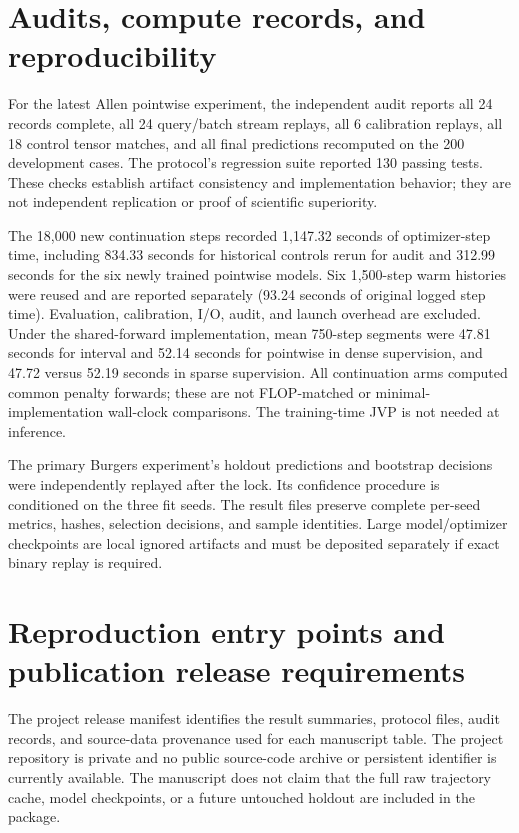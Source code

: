 \documentclass[10pt,a4paper]{article}
\begin{document}
\section{Audits, compute records, and reproducibility}
For the latest Allen pointwise experiment, the independent audit reports all 24 records complete, all 24 query/batch stream replays, all 6 calibration replays, all 18 control tensor matches, and all final predictions recomputed on the 200 development cases. The protocol's regression suite reported 130 passing tests. These checks establish artifact consistency and implementation behavior; they are not independent replication or proof of scientific superiority.

The 18,000 new continuation steps recorded 1,147.32 seconds of optimizer-step time, including 834.33 seconds for historical controls rerun for audit and 312.99 seconds for the six newly trained pointwise models. Six 1,500-step warm histories were reused and are reported separately (93.24 seconds of original logged step time). Evaluation, calibration, I/O, audit, and launch overhead are excluded. Under the shared-forward implementation, mean 750-step segments were 47.81 seconds for interval and 52.14 seconds for pointwise in dense supervision, and 47.72 versus 52.19 seconds in sparse supervision. All continuation arms computed common penalty forwards; these are not FLOP-matched or minimal-implementation wall-clock comparisons. The training-time JVP is not needed at inference.

The primary Burgers experiment's holdout predictions and bootstrap decisions were independently replayed after the lock. Its confidence procedure is conditioned on the three fit seeds. The result files preserve complete per-seed metrics, hashes, selection decisions, and sample identities. Large model/optimizer checkpoints are local ignored artifacts and must be deposited separately if exact binary replay is required.

\section{Reproduction entry points and publication release requirements}
The project release manifest identifies the result summaries, protocol files, audit records, and source-data provenance used for each manuscript table. The project repository is private and no public source-code archive or persistent identifier is currently available. The manuscript does not claim that the full raw trajectory cache, model checkpoints, or a future untouched holdout are included in the package.



\end{document}
